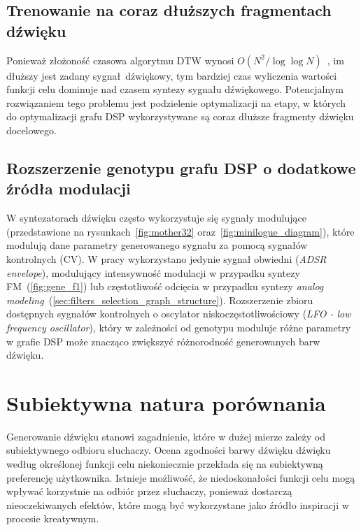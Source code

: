 \subsection{Trenowanie na coraz dłuższych fragmentach dźwięku}

Ponieważ złożoność czasowa algorytmu DTW wynosi $O(N^2/\log\log N)$~\cite{dtw_time_complexity},
im dłuższy jest zadany sygnał dźwiękowy, tym bardziej czas wyliczenia
wartości funkcji celu dominuje nad czasem syntezy sygnału dźwiękowego. Potencjalnym
rozwiązaniem tego problemu jest podzielenie optymalizacji na etapy, w których
do optymalizacji grafu DSP wykorzystywane są coraz dłuższe fragmenty dźwięku docelowego.

\subsection{Rozszerzenie genotypu grafu DSP o dodatkowe źródła modulacji}

W syntezatorach dźwięku często wykorzystuje się sygnały modulujące (przedstawione
na rysunkach~\ref{fig:mother32} oraz~\ref{fig:minilogue_diagram}), które modulują
dane parametry generowanego sygnału za pomocą sygnałów kontrolnych (CV). 
W pracy wykorzystano jedynie sygnał obwiedni (\textit{ADSR envelope}),
modulujący intensywność modulacji w przypadku syntezy FM~(\ref{fig:gene_f1})
lub częstotliwość odcięcia w przypadku syntezy
\textit{analog modeling}~(\ref{sec:filters_selection_graph_structure}).
Rozszerzenie zbioru dostępnych sygnałów kontrolnych o oscylator niskoczęstotliwościowy
(\textit{LFO - low frequency oscillator}), który w zależności od genotypu
moduluje różne parametry w grafie DSP może znacząco zwiększyć różnorodność
generowanych barw dźwięku.


\section{Subiektywna natura porównania}

Generowanie dźwięku stanowi zagadnienie,
które w dużej mierze zależy od subiektywnego odbioru słuchaczy.
Ocena zgodności barwy dźwięku dźwięku według określonej funkcji celu
niekoniecznie przekłada się na subiektywną preferencję użytkownika.
Istnieje możliwość, że niedoskonałości funkcji celu mogą wpływać korzystnie na 
odbiór przez słuchaczy, ponieważ dostarczą nieoczekiwanych efektów, 
które mogą być wykorzystane jako źródło inspiracji w procesie kreatywnym.
